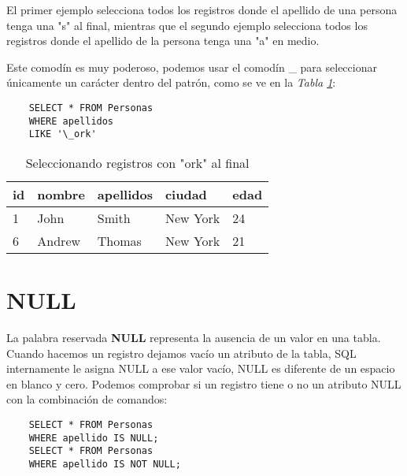 El primer ejemplo selecciona todos los registros donde el apellido de una persona tenga una "s" al final, mientras que el segundo ejemplo selecciona todos los registros donde el apellido de la persona tenga una "a" en medio.

Este comodín es muy poderoso, podemos usar el comodín \_ para seleccionar únicamente un carácter dentro del patrón, como se ve en la \textit{Tabla \ref{tab: 14}}:
\begin{lstlisting}
    SELECT * FROM Personas
    WHERE apellidos
    LIKE '\_ork'
\end{lstlisting}
\begin{table}[H]
    \centering
    \caption{Seleccionando registros con "ork" al final}
    \label{tab: 14}
    \begin{tabular}{|l|l|l|l|l|}
        \hline
        \textbf{id} & \textbf{nombre} & \textbf{apellidos} & \textbf{ciudad} & \textbf{edad} \\
        \hline
        1 & John        & Smith     & New York      & 24 \\
        \hline
        6 & Andrew      & Thomas    & New York      & 21 \\
        \hline
    \end{tabular}
\end{table}



\section{NULL}

La palabra reservada \textbf{NULL} representa la ausencia de un valor en una tabla. Cuando hacemos un registro dejamos vacío un atributo de la tabla, SQL internamente le asigna NULL a ese valor vacío, NULL es diferente de un espacio en blanco y cero. Podemos comprobar si un registro tiene o no un atributo NULL con la combinación de comandos:
\begin{lstlisting}
    SELECT * FROM Personas
    WHERE apellido IS NULL;
    SELECT * FROM Personas
    WHERE apellido IS NOT NULL;
\end{lstlisting}
